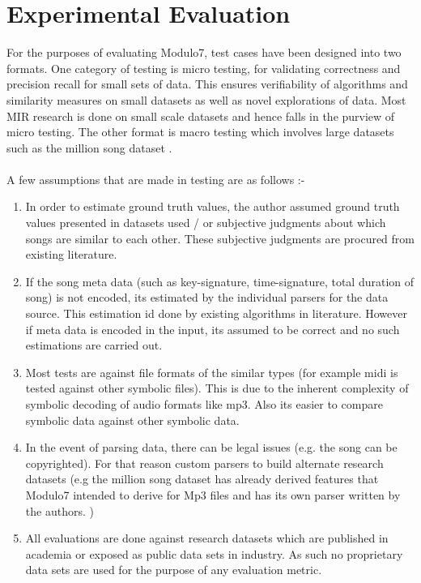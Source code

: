 \chapter{Experimental Evaluation}

\noindent For the purposes of evaluating Modulo7, test cases have been designed into two formats. One category of testing is micro testing, for validating correctness and precision recall for small sets of data. This ensures verifiability of algorithms and similarity measures on small datasets as well as novel explorations of data. Most MIR research is done on small scale datasets and hence falls in the purview of micro testing. The other format is macro testing which involves large datasets such as the million song dataset \cite{msd}. \\\\
A few assumptions that are made in testing are as follows :-
\begin{enumerate}
\item In order to estimate ground truth values, the author assumed ground truth values presented in datasets used / or subjective judgments about which songs are similar to each other. These subjective judgments are procured from existing literature.
\item If the song meta data (such as key-signature, time-signature, total duration of song) is not encoded, its estimated by the individual parsers for the data source. This estimation id done by existing algorithms in literature. However if meta data is encoded in the input, its assumed to be correct and no such estimations are carried out. 
\item Most tests are against file formats of the similar types (for example midi is tested against other symbolic files). This is due to the inherent complexity of symbolic decoding of audio formats like mp3. Also its easier to compare symbolic data against other symbolic data.
\item In the event of parsing data, there can be legal issues (e.g. the song can be copyrighted). For that reason custom parsers to build alternate research datasets (e.g the million song dataset has already derived features that Modulo7 intended to derive for Mp3 files and has its own parser written by the authors. \cite{msd})
\item All evaluations are done against research datasets which are published in academia or exposed as public data sets in industry. As such no proprietary data sets are used for the purpose of any evaluation metric.
\end{enumerate}

